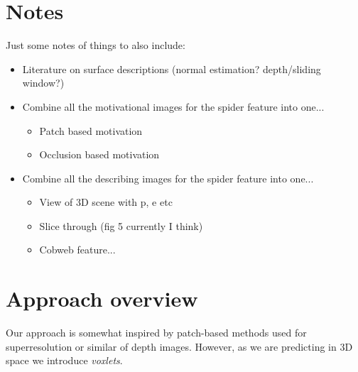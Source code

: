 \documentclass[10pt,twocolumn,letterpaper]{article}
\begin{document}
\section{Notes}
Just some notes of things to also include:

\begin{itemize}
\item Literature on surface descriptions (normal estimation? depth/sliding window?)
\item Combine all the motivational images for the spider feature into one...
\begin{itemize}
\item Patch based motivation
\item Occlusion based motivation
\end{itemize}
\item Combine all the describing images for the spider feature into one...
\begin{itemize}
\item View of 3D scene with p, e etc
\item Slice through (fig 5 currently I think)
\item Cobweb feature...
\end{itemize}
\end{itemize}


\section{Approach overview}

Our approach is somewhat inspired by patch-based methods used for superresolution or similar of depth images. 
However, as we are predicting in 3D space we introduce \emph{voxlets}.

\end{document}
